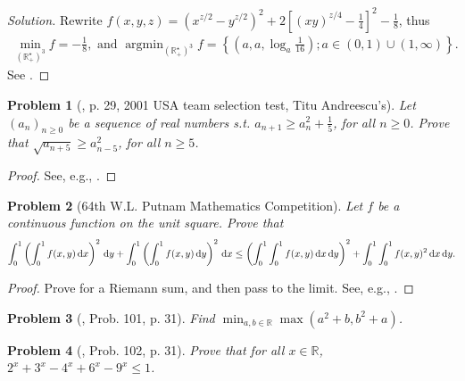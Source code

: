 \documentclass[oneside]{book}
\numberwithin{equation}{section}
\newtheorem{problem}{Problem}[section]
\begin{document}
\begin{proof}[Solution]
	Rewrite $f(x,y,z) = \left(x^{z/2} - y^{z/2}\right)^2 + 2\left[(xy)^{z/4} - \frac{1}{4}\right]^2 - \frac{1}{8}$, thus
	\begin{align*}
		\min_{(\mathbb{R}_+^\star)^3} f = -\frac{1}{8},\mbox{ and }\operatorname{argmin}_{(\mathbb{R}_+^\star)^3} f = \left\{\left(a,a,\log_a\frac{1}{16}\right);a\in(0,1)\cup(1,\infty)\right\}.
	\end{align*}
	See \cite[p. 29]{Gelca_Andreescu2017}.
\end{proof}

\begin{problem}[\cite{Gelca_Andreescu2017}, p. 29, 2001 USA team selection test, Titu Andreescu's]
	Let $(a_n)_{n\ge 0}$ be a sequence of real numbers s.t. $a_{n+1}\ge a_n^2 + \frac{1}{5}$, for all $n\ge 0$. Prove that $\sqrt{a_{n+5}}\ge a_{n-5}^2$, for all $n\ge 5$.
\end{problem}

\begin{proof}[Proof]
	See, e.g., \cite[p. 29]{Gelca_Andreescu2017}.
\end{proof}

\begin{problem}[64th W.L. Putnam Mathematics Competition]
	Let $f$ be a continuous function on the unit square. Prove that
	\begin{align*}
		\int_0^1 \left(\int_0^1 f(x,y)\,{\rm d}x\right)^2\,{\rm d}y + \int_0^1 \left(\int_0^1 f(x,y)\,{\rm d}y\right)^2\,{\rm d}x\le\left(\int_0^1\int_0^1 f(x,y)\,{\rm d}x\,{\rm d}y\right)^2 + \int_0^1\int_0^1 f(x,y)^2\,{\rm d}x\,{\rm d}y.
	\end{align*}
\end{problem}

\begin{proof}[Proof]
	Prove for a Riemann sum, and then pass to the limit. See, e.g., \cite[pp. 30--31]{Gelca_Andreescu2017}.
\end{proof}

\begin{problem}[\cite{Gelca_Andreescu2017}, Prob. 101, p. 31]
	Find $\min_{a,b\in\mathbb{R}}\max(a^2 + b,b^2 + a)$.
\end{problem}

\begin{problem}[\cite{Gelca_Andreescu2017}, Prob. 102, p. 31]
	Prove that for all $x\in\mathbb{R}$, $2^x + 3^x - 4^x + 6^x - 9^x\le 1$.
\end{problem}
\end{document}
